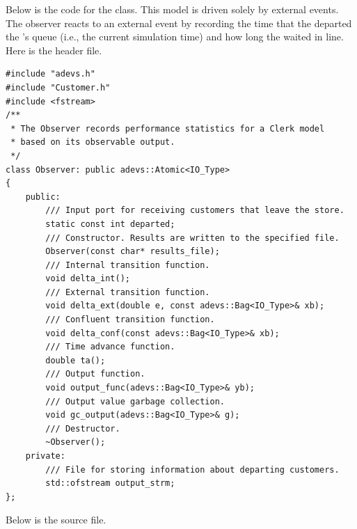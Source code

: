 Below is the code for the  class. This model is driven solely by external events. The observer reacts to an external event by recording the time that the  departed the 's queue (i.e., the current simulation time) and how long the  waited in line. Here is the  header file.
\begin{verbatim}
#include "adevs.h"
#include "Customer.h"
#include <fstream>
/**
 * The Observer records performance statistics for a Clerk model
 * based on its observable output.
 */
class Observer: public adevs::Atomic<IO_Type>
{
    public:
        /// Input port for receiving customers that leave the store.
        static const int departed;
        /// Constructor. Results are written to the specified file.
        Observer(const char* results_file);
        /// Internal transition function.
        void delta_int();
        /// External transition function.
        void delta_ext(double e, const adevs::Bag<IO_Type>& xb);
        /// Confluent transition function.
        void delta_conf(const adevs::Bag<IO_Type>& xb);
        /// Time advance function.
        double ta();
        /// Output function.  
        void output_func(adevs::Bag<IO_Type>& yb);
        /// Output value garbage collection.
        void gc_output(adevs::Bag<IO_Type>& g);
        /// Destructor.
        ~Observer();
    private:    
        /// File for storing information about departing customers.
        std::ofstream output_strm;
}; 
\end{verbatim}
Below is the  source file.
